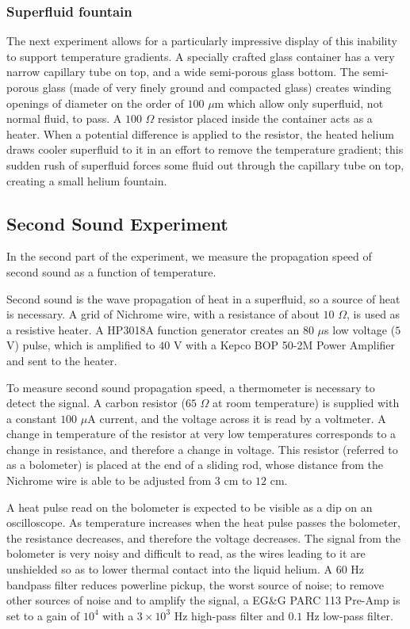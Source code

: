 \subsubsection{Superfluid fountain}\label{superfluidfountain}

The next experiment allows for a particularly impressive display of this inability to support temperature gradients. A specially crafted glass container has a very narrow capillary tube on top, and a wide semi-porous glass bottom. The semi-porous glass (made of very finely ground and compacted glass) creates winding openings of diameter on the order of $100$ $\mu$m which allow only superfluid, not normal fluid, to pass. A $100$ $\Omega$ resistor placed inside the container acts as a heater. When a potential difference is applied to the resistor, the heated helium draws cooler superfluid to it in an effort to remove the temperature gradient; this sudden rush of superfluid forces some fluid out through the capillary tube on top, creating a small helium fountain.

\subsection{Second Sound Experiment}

In the second part of the experiment, we measure the propagation speed of second sound as a function of temperature.

Second sound is the wave propagation of heat in a superfluid, so a source of heat is necessary. A grid of Nichrome wire, with a resistance of about $10$ $\Omega$, is used as a resistive heater. A HP3018A function generator creates an $80$ $\mu$s low voltage ($5$ V) pulse, which is amplified to $40$ V with a Kepco BOP 50-2M Power Amplifier and sent to the heater. 

To measure second sound propagation speed, a thermometer is necessary
to detect the signal. A carbon resistor ($65$ $\Omega$ at room
temperature) is supplied with a constant $100$ $\mu$A current, and the
voltage across it is read by a voltmeter. A change in temperature of
the resistor at very low temperatures corresponds to a change in
resistance, and therefore a change in voltage. This resistor (referred
to as a bolometer) is placed at the end of a sliding rod, whose
distance from the Nichrome wire is able to be adjusted from $3$ cm to
$12$ cm.

A heat pulse read on the bolometer is expected to be visible as a dip
on an oscilloscope. As temperature increases when the heat pulse
passes the bolometer, the resistance decreases, and therefore the
voltage decreases. The signal from the bolometer is very noisy and
difficult to read, as the wires leading to it are unshielded so as to
lower thermal contact into the liquid helium. A $60$ Hz bandpass
filter reduces powerline pickup, the worst source of noise; to remove
other sources of noise and to amplify the signal, a EG\&G PARC 113
Pre-Amp is set to a gain of $10^4$ with a $3\times 10^3$ Hz high-pass
filter and $0.1$ Hz low-pass filter.

